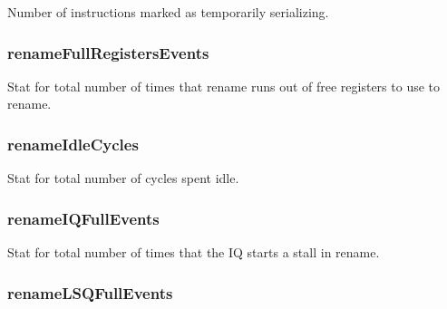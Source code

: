 \label{classDefaultRename_a94f16020be7d9c91aa978ce88f0adb1b}
Number of instructions marked as temporarily serializing. \hypertarget{classDefaultRename_ac012d0908acb20c3f68593787f626711}{
\subsubsection[{renameFullRegistersEvents}]{ {\bf renameFullRegistersEvents}}}
\label{classDefaultRename_ac012d0908acb20c3f68593787f626711}
Stat for total number of times that rename runs out of free registers to use to rename. \hypertarget{classDefaultRename_a53baed8fe49369b373c3dd986c683596}{
\subsubsection[{renameIdleCycles}]{ {\bf renameIdleCycles}}}
\label{classDefaultRename_a53baed8fe49369b373c3dd986c683596}
Stat for total number of cycles spent idle. \hypertarget{classDefaultRename_a9a4bab1aece13e48ae2d2a3f247b3354}{
\subsubsection[{renameIQFullEvents}]{ {\bf renameIQFullEvents}}}
\label{classDefaultRename_a9a4bab1aece13e48ae2d2a3f247b3354}
Stat for total number of times that the IQ starts a stall in rename. \hypertarget{classDefaultRename_aba431e021496d1070a1d8f9ad7ec71f2}{
\subsubsection[{renameLSQFullEvents}]{ {\bf renameLSQFullEvents}}}
